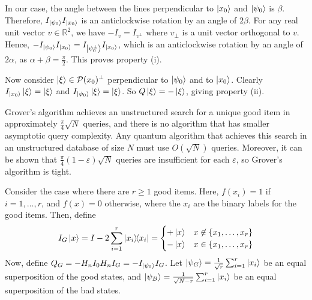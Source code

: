 In our case, the angle between the lines perpendicular to \( \ket{x_0} \) and \( \ket{\psi_0} \) is \( \beta \).
Therefore, \( I_{\ket{\psi_0}} I_{\ket{x_0}} \) is an anticlockwise rotation by an angle of \( 2\beta \).
For any real unit vector \( v \in \mathbb R^2 \), we have \( -I_v = I_{v^\perp} \) where \( v_\perp \) is a unit vector orthogonal to \( v \).
Hence, \( -I_{\ket{\psi_0}} I_{\ket{x_0}} = I_{\ket{\psi_0^\perp}} I_{\ket{x_0}} \), which is an anticlockwise rotation by an angle of \( 2\alpha \), as \( \alpha + \beta = \frac{\pi}{2} \).
This proves property (i).

Now consider \( \ket{\xi} \in \mathcal P(x_0)^\perp \) perpendicular to \( \ket{\psi_0} \) and to \( \ket{x_0} \).
Clearly \( I_{\ket{x_0}} \ket{\xi} = \ket{\xi} \) and \( I_{\ket{\psi_0}} \ket{\xi} = \ket{\xi} \).
So \( Q \ket{\xi} = -\ket{\xi} \), giving property (ii).

Grover's algorithm achieves an unstructured search for a unique good item in approximately \( \frac{\pi}{4}\sqrt{N} \) queries, and there is no algorithm that has smaller asymptotic query complexity.
Any quantum algorithm that achieves this search in an unstructured database of size \( N \) must use \( O(\sqrt{N}) \) queries.
Moreover, it can be shown that \( \frac{\pi}{4} (1 - \varepsilon) \sqrt{N} \) queries are insufficient for each \( \varepsilon \), so Grover's algorithm is tight.

Consider the case where there are \( r \geq 1 \) good items.
Here, \( f(x_i) = 1 \) if \( i = 1, \dots, r \), and \( f(x) = 0 \) otherwise, where the \( x_i \) are the binary labels for the good items.
Then, define
\[ I_G \ket{x} = I - 2\sum_{i=1}^r \op{x_i}{x_i} = \begin{cases}
    +\ket{x} & x \not\in \qty{x_1, \dots, x_r} \\
    -\ket{x} & x \in \qty{x_1, \dots, x_r}
\end{cases} \]
Now, define \( Q_G = -H_n I_0 H_n I_G = -I_{\ket{\psi_0}} I_G \).
Let \( \ket{\psi_G} = \frac{1}{\sqrt{r}} \sum_{i=1}^r \ket{x_i} \) be an equal superposition of the good states, and \( \ket{\psi_B} = \frac{1}{\sqrt{N-r}} \sum_{i=1}^r \ket{x_i} \) be an equal superposition of the bad states.
